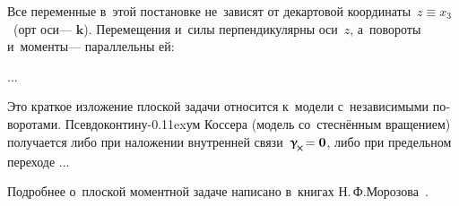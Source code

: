 

\label{para:planedeformation.cosseratcontinuum}

\begin{otherlanguage}{russian}

Все переменные в~этой постановке не~зависят от декартовой координаты~${z \equiv x_3}$~(орт оси\:--- $\bm{k}$).
Перемещения и~силы перпендикулярны оси~$z$, а~повороты и~моменты\:--- параллельны ей:

...


Это краткое изложение плоской задачи относится к~модели с~независимыми поворотами.
Псевдоконтину\kern-0.11exум Коссера (модель со~стеснённым вращением) получается либо при наложении внутренней связи~${\distortiontensor_{\hspace{-0.25ex}\Xcompanion} \hspace{-0.32ex} = \bm{0}}$, либо при предельном переходе ...

Подробнее о~плоской моментной задаче написано в~книгах Н.\,Ф.\;Морозова~\cite{morozov-twodimensionalproblems, morozov-fractures}.

\end{otherlanguage}



\label{para:nonlinear.micropolar}

